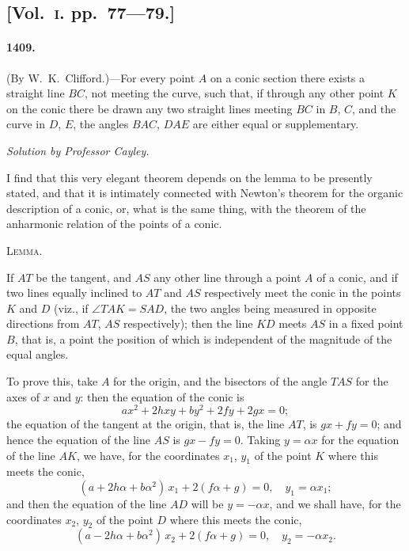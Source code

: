 \documentclass[11pt,a4paper]{article}
\begin{document}
\subsection*{[Vol.~\textsc{i}. pp.\ 77---79.]}

\paragraph*{1409.} (By W.~K.~Clifford.)---For every point $A$ on a conic section there exists
a straight line $BC$, not meeting the curve, such that, if through any other point $K$
on the conic there be drawn any two straight lines meeting $BC$ in $B$, $C$, and the
curve in $D$, $E$, the angles $BAC$, $DAE$ are either equal or supplementary.

\begin{center}
\textit{Solution by Professor Cayley.}
\end{center}

I find that this very elegant theorem depends on the lemma to be presently
stated, and that it is intimately connected with Newton's theorem for the organic
description of a conic, or, what is the same thing, with the theorem of the anharmonic
relation of the points of a conic.

\begin{center}
\textsc{Lemma.}
\end{center}

If $AT$ be the tangent, and $AS$ any other line through a point $A$ of a
conic, and if two lines equally inclined to $AT$ and $AS$ respectively meet the conic
in the points $K$ and $D$ (viz., if $\angle TAK = SAD$, the two angles being measured in
opposite directions from $AT$, $AS$ respectively); then the line $KD$ meets $AS$ in a
fixed point $B$, that is, a point the position of which is independent of the magnitude
of the equal angles.

To prove this, take $A$ for the origin, and the bisectors of the angle $TAS$ for
the axes of $x$ and $y$: then the equation of the conic is
\[
ax^2 + 2hxy + by^2 + 2fy + 2gx = 0;
\]
the equation of the tangent at the origin, that is, the line $AT$, is $gx+fy=0$; and
hence the equation of the line $AS$ is $gx-fy=0$. Taking $y=\alpha x$ for the equation
of the line $AK$, we have, for the coordinates $x_1$, $y_1$ of the point $K$ where this meets
the conic,
\[
(a + 2h\alpha + b\alpha^2)\,x_1 + 2(f\alpha + g) = 0, \quad y_1 = \alpha x_1;
\]
and then the equation of the line $AD$ will be $y=-\alpha x$, and we shall have, for the
coordinates $x_2$, $y_2$ of the point $D$ where this meets the conic,
\[
(a - 2h\alpha + b\alpha^2)\,x_2 + 2(f\alpha + g) = 0, \quad y_2 = -\alpha x_2.
\]
\end{document}
